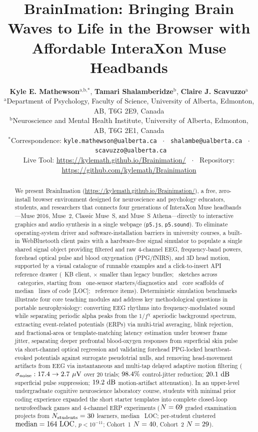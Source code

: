 \documentclass[11pt]{article}
\title{\textbf{BrainImation: Bringing Brain Waves to Life in the Browser with Affordable InteraXon Muse Headbands}}
\author{
\parbox{0.94\textwidth}{\centering
\textbf{Kyle E. Mathewson}$^{\text{a,b,*}}$, \textbf{Tamari Shalamberidze}$^{\text{b}}$, \textbf{Claire J. Scavuzzo}$^{\text{a}}$\\[5pt]
\footnotesize $^{\text{a}}$Department of Psychology, Faculty of Science, University of Alberta, Edmonton, AB, T6G 2E9, Canada\\
\footnotesize $^{\text{b}}$Neuroscience and Mental Health Institute, University of Alberta, Edmonton, AB, T6G 2E1, Canada\\
\footnotesize $^*$Correspondence: \texttt{kyle.mathewson@ualberta.ca} \ $\cdot$ \ \texttt{shalambe@ualberta.ca} \ $\cdot$ \ \texttt{scavuzzo@ualberta.ca}\\
\footnotesize Live Tool: \url{https://kylemath.github.io/Brainimation/} \ $\cdot$ \ Repository: \url{https://github.com/kylemath/Brainimation}
}
}
\date{}
\begin{document}
\maketitle

\begin{abstract}
We present BrainImation (\url{https://kylemath.github.io/Brainimation/}), a free, zero-install browser environment designed for neuroscience and psychology educators, students, and researchers that connects four generations of InteraXon Muse headbands---Muse 2016, Muse~2, Classic Muse~S, and Muse~S Athena---directly to interactive graphics and audio synthesis in a single webpage (\texttt{p5.js}, \texttt{p5.sound}). To eliminate operating-system driver and software-installation barriers in university courses, a built-in WebBluetooth client pairs with a hardware-free signal simulator to populate a single shared signal object providing filtered and raw 4-channel EEG, frequency-band powers, forehead optical pulse and blood oxygenation (PPG/fNIRS), and 3D head motion, supported by a visual catalogue of runnable examples and a click-to-insert API reference drawer (\MuseBrowserKB~KB client, \BundleReductionFactor$\times$ smaller than legacy bundles; \NCatalogueSketches\ sketches across \NCatalogueCategories\ categories, starting from \NStarterDiag\ one-sensor starters/diagnostics and \NBuiltinExamples\ core scaffolds of median \ExLOCMedian\ lines of code [LOC]; \NRefAPIs\ reference items). Deterministic simulation benchmarks illustrate four core teaching modules and address key methodological questions in portable neurophysiology: converting EEG rhythms into frequency-modulated sound while separating periodic alpha peaks from the $1/f^{\chi}$ aperiodic background spectrum, extracting event-related potentials (ERPs) via multi-trial averaging, blink rejection, and fractional-area or template-matching latency estimation under browser frame jitter, separating deeper prefrontal blood-oxygen responses from superficial skin pulse via short-channel optical regression and validating forehead PPG-locked heartbeat-evoked potentials against surrogate pseudotrial nulls, and removing head-movement artifacts from EEG via instantaneous and multi-tap delayed adaptive motion filtering ($\sigma_{\text{noise}}: 17.4 \rightarrow 2.7\ \mu\text{V}$ over 20 trials; $98.4\%$ control-jitter reduction; $20.1\text{ dB}$ superficial pulse suppression; $19.2\text{ dB}$ motion-artifact attenuation). In an upper-level undergraduate cognitive neuroscience laboratory course, students with minimal prior coding experience expanded the short starter templates into complete closed-loop neurofeedback games and 4-channel ERP experiments ($N = 69$ graded examination projects from $N_{\text{students}} = 30$ learners, median \StuLOCMedian\ LOC; per-student clustered $\text{median} = 164\text{ LOC}$, $p < 10^{-11}$; Cohort~1 $N = 40$, Cohort~2 $N = 29$).\\[4pt]

\end{abstract}
\end{document}
